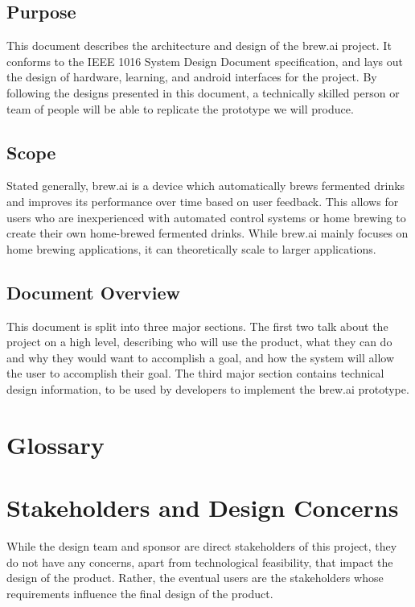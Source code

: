 \documentclass[draftclsnofoot,onecolumn,letterpaper,10pt]{IEEEtran}
\begin{document}
\subsection{Purpose}
This document describes the architecture and design of the brew.ai project.
It conforms to the IEEE 1016 System Design Document specification, and lays out the design of hardware, learning, and android interfaces for the project.
By following the designs presented in this document, a technically skilled person or team of people will be able to replicate the prototype we will produce.

\subsection{Scope}
Stated generally, brew.ai is a device which automatically brews fermented drinks and improves its performance over time based on user feedback.
This allows for users who are inexperienced with automated control systems or home brewing to create their own home-brewed fermented drinks.
While brew.ai mainly focuses on home brewing applications, it can theoretically scale to larger applications.

\subsection{Document Overview}
This document is split into three major sections.
The first two talk about the project on a high level, describing who will use the product, what they can do and why they would want to accomplish a goal, and how the system will allow the user to accomplish their goal.
The third major section contains technical design information, to be used by developers to implement the brew.ai prototype.


\section{Glossary}

\section{Stakeholders and Design Concerns}
While the design team and sponsor are direct stakeholders of this project, they do not have any concerns, apart from technological feasibility, that impact the design of the product.
Rather, the eventual users are the stakeholders whose requirements influence the final design of the product.
\end{document}
